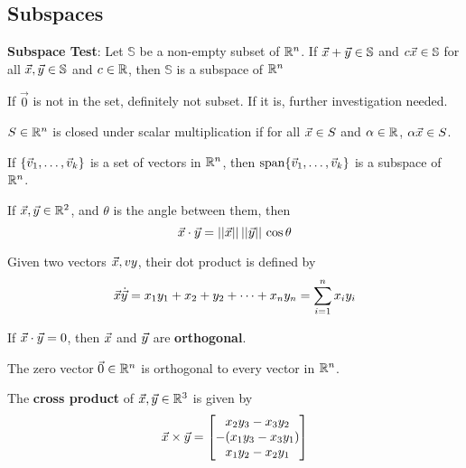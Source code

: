 \documentclass[english, 12pt]{article}
\begin{document}
\subsection{Subspaces}
\begin{thrm}
\textbf{Subspace Test}: Let $\mathbb{S}$ be a non-empty subset of ${\mathbb{R}}^n$. If $\vec{x} + \vec{y} \in \mathbb{S}$ and $c \vec{x} \in \mathbb{S}$ for all $\vec{x},\vec{y} \in \mathbb{S}$ and $c \in {\mathbb{R}}$, then $\mathbb{S}$ is a subspace of ${\mathbb{R}}^n$
\end{thrm}
\begin{qte}
If $\vec{0}$ is not in the set, definitely not subset. If it is, further investigation needed.
\end{qte}


\begin{defn}
$S \in {\mathbb{R}}^n$ is closed under scalar multiplication if for all $\vec{x} \in S$ and $\alpha \in {\mathbb{R}}$, $\alpha \vec{x} \in S$.
\end{defn}

\begin{thrm}
If $\{\vec{v}_{1},\dots,\vec{v}_{k}\}$ is a set of vectors in ${\mathbb{R}}^n$, then $\operatorname{span} \{\vec{v}_{1},\dots,\vec{v}_{k}\}$ is a subspace of ${\mathbb{R}}^n$.
\end{thrm}

\begin{thrm}
If $\vec{x},\vec{y} \in {\mathbb{R}}^2$, and $\theta$ is the angle between them, then 
\[\vec{x} \cdot \vec{y} = ||\vec{x}||\,||\vec{y}||\, \cos \theta\]
\end{thrm}
\begin{thrm}
Given two vectors $\vec{x},vy$, their dot product is defined by 
\[\vec{x} \dot {\vec{y}} = x_{1} y_{1} + x_{2} + y_{2} + \cdots + x_{n} y_{n} = \sum_{i=1}^n x_{i} y_{i}\]
\end{thrm}
\begin{thrm}
If $\vec{x} \cdot \vec{y} = 0$, then $\vec{x}$ and $\vec{y}$ are \textbf{orthogonal}.
\end{thrm}
\begin{qte}
The zero vector $\vec{0} \in {\mathbb{R}}^n$ is orthogonal to every vector in ${\mathbb{R}}^n$.
\end{qte}
\begin{thrm}
The \textbf{cross product} of $\vec{x},\vec{y} \in {\mathbb{R}}^3$ is given by 
\[\vec{x} \times \vec{y} = 
\begin{bmatrix}
x_{2}y_{3} - x_{3} y_{2} \\
- (x_{1} y_{3} - x_{3} y_{1}) \\
x_{1} y_{2} - x_{2} y_{1}
\end{bmatrix}\]
\end{thrm}
\end{document}
